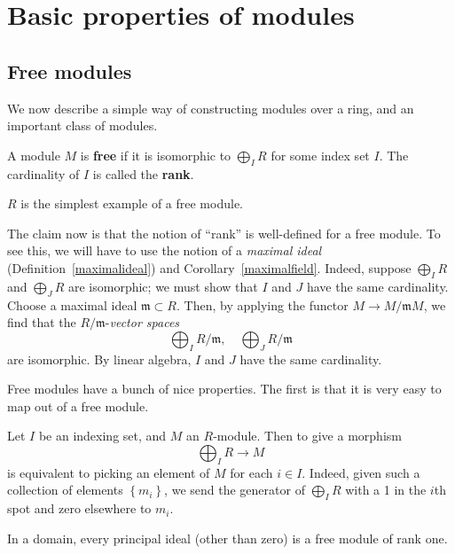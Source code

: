 \section{Basic properties of modules}

\subsection{Free modules}

We now describe a simple way of constructing modules over a ring, and an
important class of modules.

\begin{definition} 
A module $M$ is \textbf{free} if it is isomorphic to $\bigoplus_I R$ for some
index set $I$. The cardinality of $I$ is called the \textbf{rank}.
\end{definition} 

\begin{example} 
$R$ is the simplest example of a free module.
\end{example} 

The claim now is that the notion of ``rank'' is well-defined for a free
module. To see this, we will have to use the notion 
of a \emph{maximal ideal} (Definition~\ref{maximalideal}) and
Corollary~\ref{maximalfield}.
Indeed, suppose
$\bigoplus_I R$ and $\bigoplus_J R$ are isomorphic; we must show that $I$ and
$J$ have the same cardinality. Choose a maximal ideal $\mathfrak{m}
\subset R$. Then, by applying the functor $M \to
M/\mathfrak{m}M$, we find that the $R/\mathfrak{m}$-\emph{vector spaces}
\[ \bigoplus_I R/\mathfrak{m}, \quad \bigoplus_J R/\mathfrak{m}  \]
are isomorphic. By linear algebra, $I$ and $J$ have the same cardinality. 


Free modules have a bunch of nice properties. The first is that it is very
easy to map out of a free module.
\begin{example} 
Let $I$ be an indexing set, and $M$ an $R$-module. Then to give a morphism
\[ \bigoplus_I R \to M  \]
is equivalent to picking an element of $M$ for each $i \in I$. Indeed, given
such a collection of elements $\left\{m_i\right\}$, we send the generator of $\bigoplus_I R$ with a 1
in the $i$th spot and zero elsewhere to $m_i$.
\end{example}

\begin{example} 
In a domain, every principal ideal (other than zero) is a free module of rank
one.
\end{example} 

